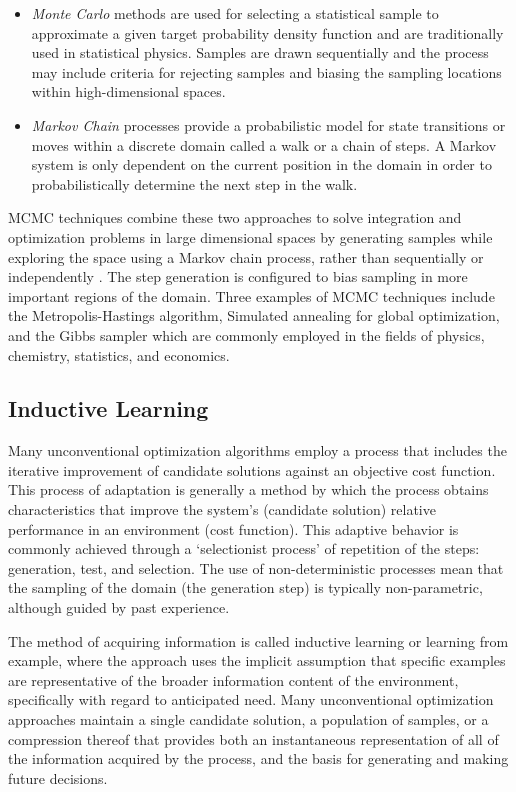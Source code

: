 \begin{bibunit}
\begin{itemize}
	\item \emph{Monte Carlo} methods are used for selecting a statistical sample to approximate a given target probability density function and are traditionally used in statistical physics. Samples are drawn sequentially and the process may include criteria for rejecting samples and biasing the sampling locations within high-dimensional spaces. 
	\item \emph{Markov Chain} processes provide a probabilistic model for state transitions or moves within a discrete domain called a walk or a chain of steps. A Markov system is only dependent on the current position in the domain in order to probabilistically determine the next step in the walk.
\end{itemize}

MCMC techniques combine these two approaches to solve integration and optimization problems in large dimensional spaces by generating samples while exploring the space using a Markov chain process, rather than sequentially or independently \cite{Andrieu2003}. The step generation is configured to bias sampling in more important regions of the domain. Three examples of MCMC techniques include the Metropolis-Hastings algorithm, Simulated annealing for global optimization, and the Gibbs sampler which are commonly employed in the fields of physics, chemistry, statistics, and economics. 

% 
% 
\subsection{Inductive Learning}
\label{subsec:induction}
Many unconventional optimization algorithms employ a process that includes the iterative improvement of candidate solutions against an objective cost function. This process of adaptation is generally a method by which the process obtains characteristics that improve the system's (candidate solution) relative performance in an environment (cost function). This adaptive behavior is commonly achieved through a `selectionist process' of repetition of the steps: generation, test, and selection. The use of non-deterministic processes mean that the sampling of the domain (the generation step) is typically non-parametric, although guided by past experience. 

The method of acquiring information is called inductive learning or learning from example, where the approach uses the implicit assumption that specific examples are representative of the broader information content of the environment, specifically with regard to anticipated need. Many unconventional optimization approaches maintain a single candidate solution, a population of samples, or a compression thereof that provides both an instantaneous representation of all of the information acquired by the process, and the basis for generating and making future decisions. 


\end{bibunit}
